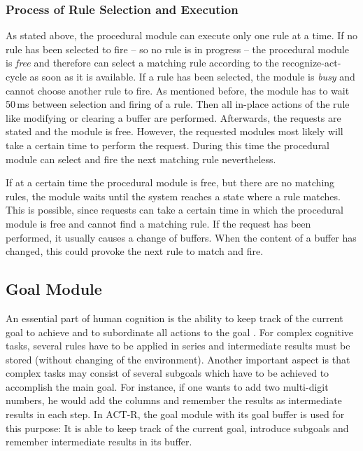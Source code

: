 \subsubsection{Process of Rule Selection and Execution}
\label{process_of_rule_selection_and_execution}

As stated above, the procedural module can execute only one rule at a time. If no rule has been selected to fire -- so no rule is in progress -- the procedural module is \emph{free} and therefore can select a matching rule according to the recognize-act-cycle as soon as it is available. If a rule has been selected, the module is \emph{busy} and cannot choose another rule to fire. As mentioned before, the module has to wait 50\,ms between selection and firing of a rule. Then all in-place actions of the rule like modifying or clearing a buffer are performed. Afterwards, the requests are stated and the module is free. However, the requested modules most likely will take a certain time to perform the request. During this time the procedural module can select and fire the next matching rule nevertheless.

If at a certain time the procedural module is free, but there are no matching rules, the module waits until the system reaches a state where a rule matches. This is possible, since requests can take a certain time in which the procedural module is free and cannot find a matching rule. If the request has been performed, it usually causes a change of buffers. When the content of a buffer has changed, this could provoke the next rule to match and fire.

\subsection{Goal Module}

An essential part of human cognition is the ability to keep track of the current goal to achieve and to subordinate all actions to the goal \cite[p. 1041]{anderson_integrated_2004}. For complex cognitive tasks, several rules have to be applied in series and intermediate results must be stored (without changing of the environment). Another important aspect is that complex tasks may consist of several subgoals which have to be achieved to accomplish the main goal. For instance, if one wants to add two multi-digit numbers, he would add the columns and remember the results as intermediate results in each step. In ACT-R, the goal module with its goal buffer is used for this purpose: It is able to keep track of the current goal, introduce subgoals and remember intermediate results in its buffer. 

